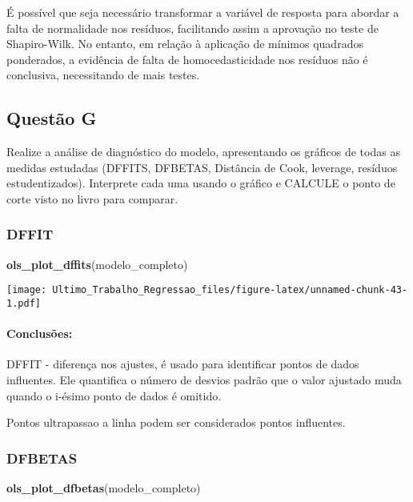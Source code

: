 \documentclass[
]{article}
\newenvironment{Shaded}{\begin{snugshade}}{\end{snugshade}}
\newcommand{\FunctionTok}[1]{\textcolor[rgb]{0.13,0.29,0.53}{\textbf{#1}}}
\newcommand{\NormalTok}[1]{#1}
\begin{document}
É possível que seja necessário transformar a variável de resposta para
abordar a falta de normalidade nos resíduos, facilitando assim a
aprovação no teste de Shapiro-Wilk. No entanto, em relação à aplicação
de mínimos quadrados ponderados, a evidência de falta de
homocedasticidade nos resíduos não é conclusiva, necessitando de mais
testes.

\hypertarget{questuxe3o-g}{%
\subsection{Questão G}\label{questuxe3o-g}}

Realize a análise de diagnóstico do modelo, apresentando os gráficos de
todas as medidas estudadas (DFFITS, DFBETAS, Distância de Cook,
leverage, resíduos estudentizados). Interprete cada uma usando o gráfico
e CALCULE o ponto de corte visto no livro para comparar.

\hypertarget{dffit}{%
\subsubsection{DFFIT}\label{dffit}}

\begin{Shaded}
\begin{Highlighting}[]
\FunctionTok{ols\_plot\_dffits}\NormalTok{(modelo\_completo)}
\end{Highlighting}
\end{Shaded}

\texttt{[image: Ultimo\_Trabalho\_Regressao\_files/figure-latex/unnamed-chunk-43-1.pdf]}

\hypertarget{conclusuxf5es-7}{%
\paragraph{Conclusões:}\label{conclusuxf5es-7}}

DFFIT - diferença nos ajustes, é usado para identificar pontos de dados
influentes. Ele quantifica o número de desvios padrão que o valor
ajustado muda quando o i-ésimo ponto de dados é omitido.

Pontos ultrapassao a linha podem ser considerados pontos influentes.

\hypertarget{dfbetas}{%
\subsubsection{DFBETAS}\label{dfbetas}}

\begin{Shaded}
\begin{Highlighting}[]
\FunctionTok{ols\_plot\_dfbetas}\NormalTok{(modelo\_completo)}
\end{Highlighting}
\end{Shaded}
\end{document}
